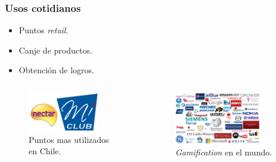 \documentclass[10pt, compress]{beamer}
\begin{document}
\begin{frame}
 \frametitle{Usos cotidianos}
\begin{center}
        \begin{itemize}
          \item Puntos \emph{retail}.
          \item Canje de productos.
	  \item Obtención de logros.
        \end{itemize}
\end{center}

\begin{columns}[onlytextwidth]
\begin{figure}
\centering
    \includegraphics[width=0.8\textwidth]{images/retail.png}
    \caption{Puntos mas utilizados en Chile.}
    \label{fig:awesome_image}
\end{figure}

\begin{figure}
\centering
    \includegraphics[width=0.8\textwidth]{images/gamAll.jpg}
    \caption{\emph{Gamification} en el mundo.}
    \label{fig:awesome_image}
\end{figure}

\end{columns}
\end{frame}
\end{document}
